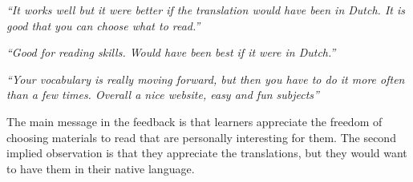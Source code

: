 \begin{description}
  \item {\em ``It works well but it were better if the translation would have been in Dutch. It is good that you can choose what to read.''}
  \item {\em ``Good for reading skills. Would have been best if it were in Dutch.''}
  \item {\em ``Your vocabulary is really moving forward, but then you have to do it more often than a few times. Overall a nice website, easy and fun subjects''}
\end{description}

The main message in the feedback is that learners appreciate the freedom of choosing materials to read that are personally interesting for them. The second implied observation is that they appreciate the translations, but they would want to have them in their native language. 



